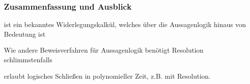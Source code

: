 \documentclass[aspectratio=1610,onlymath]{beamer}
\begin{document}
% 
% 
% 
% 



% 
% 
% 
% 


\begin{frame}\frametitle{Zusammenfassung und Ausblick}

 ist ein bekanntes Widerlegungskalkül, welches über die Aussagenlogik hinaus von Bedeutung ist
\bigskip

Wie andere Beweisverfahren für Aussagenlogik benötigt Resolution schlimmstenfalls %
\bigskip

 erlaubt logisches Schließen in polynomieller Zeit, z.B. mit Resolution.
\bigskip

\end{frame}
\end{document}
